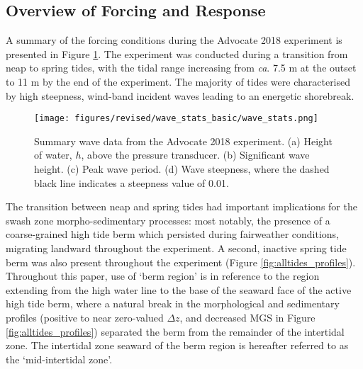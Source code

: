 \documentclass[jmse,article,submit,pdftex,moreauthors]{Definitions/mdpi}
\begin{document}
\subsection{Overview of Forcing and Response}\label{Results:Forcing}

A summary of the forcing conditions during the Advocate 2018 experiment is presented in Figure \ref{fig:wavestats}. The experiment was conducted during a transition from neap to spring tides, with the tidal range increasing from \textit{ca}. 7.5 m at the outset to 11 m by the end of the experiment. The majority of tides were characterised by high steepness, wind-band incident waves leading to an energetic shorebreak. 


\begin{figure}[tbp] %
	\texttt{[image: figures/revised/wave\_stats\_basic/wave\_stats.png]}
	\caption[Wave data: Advocate 2018 experiment]{Summary wave data from the Advocate 2018 experiment. (a) Height of water, $h$, above the pressure transducer. (b) Significant wave height. (c) Peak wave period. (d) Wave steepness, where the dashed black line indicates a steepness value of 0.01.} %
	\label{fig:wavestats}
\end{figure}


The transition between neap and spring tides had important implications for the swash zone morpho-sedimentary processes: most notably, the presence of a coarse-grained high tide berm which persisted during fairweather conditions, migrating landward throughout the experiment. A second, inactive spring tide berm was also present throughout the experiment (Figure \ref{fig:alltides_profiles}). Throughout this paper, use of `berm region' is in reference to the region extending from the high water line to the base of the seaward face of the active high tide berm, where a natural break in the morphological and sedimentary profiles (positive to near zero-valued $\Delta z$, and decreased MGS in Figure \ref{fig:alltides_profiles}) separated the berm from the remainder of the intertidal zone. The intertidal zone seaward of the berm region is hereafter referred to as the `mid-intertidal zone'.
\end{document}
